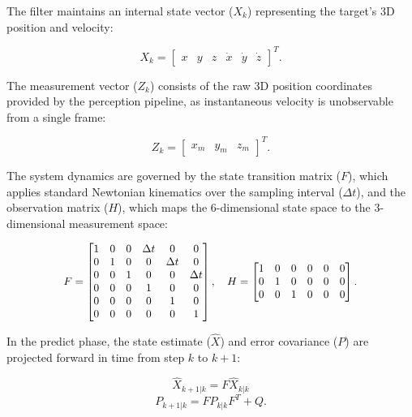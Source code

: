 \documentclass{report_template_oxford}
\begin{document}
The filter maintains an internal state vector ($X_k$) representing the target's 3D position and velocity:

\begin{equation}
    X_k = \begin{bmatrix} x & y & z & \dot{x} & \dot{y} & \dot{z} \end{bmatrix}^T.
\end{equation}

The measurement vector ($Z_k$) consists of the raw 3D position coordinates provided by the perception pipeline, as instantaneous velocity is unobservable from a single frame:

\begin{equation}
    Z_k = \begin{bmatrix} x_{m} & y_{m} & z_{m} \end{bmatrix}^T.
\end{equation}

The system dynamics are governed by the state transition matrix ($F$), which applies standard Newtonian kinematics over the sampling interval ($\Delta t$), and the observation matrix ($H$), which maps the 6-dimensional state space to the 3-dimensional measurement space:

\begin{equation}
    \resizebox{0.75\textwidth}{!}{%
        $F = \begin{bmatrix} 1 & 0 & 0 & \Delta t & 0 & 0 \\ 0 & 1 & 0 & 0 & \Delta t & 0 \\ 0 & 0 & 1 & 0 & 0 & \Delta t \\ 0 & 0 & 0 & 1 & 0 & 0 \\ 0 & 0 & 0 & 0 & 1 & 0 \\ 0 & 0 & 0 & 0 & 0 & 1 \end{bmatrix}, \quad
        H = \begin{bmatrix} 1 & 0 & 0 & 0 & 0 & 0 \\ 0 & 1 & 0 & 0 & 0 & 0 \\ 0 & 0 & 1 & 0 & 0 & 0 \end{bmatrix}.$%
    }
\end{equation}

In the predict phase, the state estimate ($\hat{X}$) and error covariance ($P$) are projected forward in time from step $k$ to $k+1$:

\begin{equation}
    \hat{X}_{k+1|k} = F \hat{X}_{k|k}
\end{equation}
\begin{equation}
    P_{k+1|k} = F P_{k|k} F^T + Q.
\end{equation}
\end{document}
